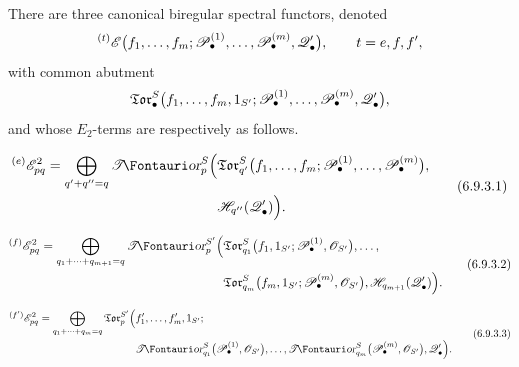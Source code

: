 \begin{proposition}[6.9.3]
\label{III.6.9.3}
There are three canonical biregular spectral functors, denoted
\[
  {}^{(t)}\mathscr{E}
  \bigl(
    f_1,\ldots,f_m;
    \mathscr{P}_\bullet^{(1)},\ldots,\mathscr{P}_\bullet^{(m)},
    \mathscr{Q}_\bullet'
  \bigr),
  \qquad
  t=e,f,f',
\]
with common abutment
\[
  \mathfrak{Tor}_\bullet^S
  \bigl(
    f_1,\ldots,f_m,1_{S'};
    \mathscr{P}_\bullet^{(1)},\ldots,\mathscr{P}_\bullet^{(m)},
    \mathscr{Q}_\bullet'
  \bigr),
\]
and whose $E_2$-terms are respectively as follows.


\begin{env}[6.9.3.1]
\label{III.6.9.3.1}
\[
\begin{split}
  {}^{(e)}\sh E_{pq}^2
  =
  \bigoplus_{q'+q''=q}
  \shTor_p^S
  \Bigl(
    &
    \mathfrak{Tor}_{q'}^S
    \bigl(
      f_1,\ldots,f_m;
      \sh P_\bullet^{(1)},\ldots,\sh P_\bullet^{(m)}
    \bigr),
    \\
    &
    \sh H_{q''}(\sh Q_\bullet')
  \Bigr).
\end{split}
  \tag{6.9.3.1}\label{III.6.9.3.1.eq}
\]
\end{env}

\begin{env}[6.9.3.2]
\label{III.6.9.3.2}
\[
\begin{split}
  {}^{(f)}\sh E_{pq}^2
  =
  \bigoplus_{q_1+\cdots+q_{m+1}=q}
  \shTor_p^{S'}
  \Bigl(
    &
    \mathfrak{Tor}_{q_1}^S
    \bigl(
      f_1,1_{S'};
      \sh P_\bullet^{(1)},\sh O_{S'}
    \bigr),
    \ldots,
    \\
    &
    \mathfrak{Tor}_{q_m}^S
    \bigl(
      f_m,1_{S'};
      \sh P_\bullet^{(m)},\sh O_{S'}
    \bigr),
    \sh H_{q_{m+1}}(\sh Q_\bullet')
  \Bigr).
\end{split}
  \tag{6.9.3.2}\label{III.6.9.3.2.eq}
\]
\end{env}

\begin{env}[6.9.3.3]
\label{III.6.9.3.3}
\[
\begin{split}
  {}^{(f')}\sh E_{pq}^2
  =
  \bigoplus_{q_1+\cdots+q_m=q}
  \mathfrak{Tor}_p^{S'}
  \Bigl(
    &
    f_1',\ldots,f_m',1_{S'};
    \\
    &
    \shTor_{q_1}^S
    \bigl(
      \sh P_\bullet^{(1)},\sh O_{S'}
    \bigr),
    \ldots,
    \shTor_{q_m}^S
    \bigl(
      \sh P_\bullet^{(m)},\sh O_{S'}
    \bigr),
    \sh Q_\bullet'
  \Bigr).
\end{split}
  \tag{6.9.3.3}\label{III.6.9.3.3.eq}
\]
\end{env}
\end{proposition}

